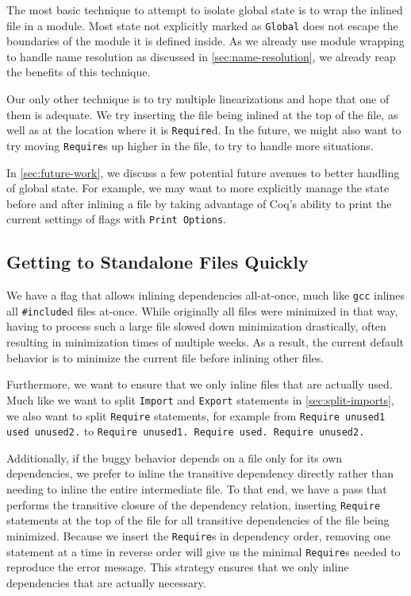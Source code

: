\documentclass[a4paper,USenglish,cleveref,autoref,thm-restate,pdfa]{lipics-v2021}
\begin{document}
The most basic technique to attempt to isolate global state is to wrap the inlined file in a module.
Most state not explicitly marked as \texttt{Global} does not escape the boundaries of the module it is defined inside.
As we already use module wrapping to handle name resolution as discussed in \autoref{sec:name-resolution}, we already reap the benefits of this technique.

Our only other technique is to try multiple linearizations and hope that one of them is adequate.
We try inserting the file being inlined at the top of the file, as well as at the location where it is \texttt{Require}d.
In the future, we might also want to try moving \texttt{Require}s up higher in the file, to try to handle more situations.

In \autoref{sec:future-work}, we discuss a few potential future avenues to better handling of global state.
For example, we may want to more explicitly manage the state before and after inlining a file by taking advantage of Coq's ability to print the current settings of flags with \texttt{Print Options}.

\subsection{Getting to Standalone Files Quickly}
We have a flag that allows inlining dependencies all-at-once, much like \texttt{gcc} inlines all \verb|#include|d files at-once.
While originally all files were minimized in that way, having to process such a large file slowed down minimization drastically, often resulting in minimization times of multiple weeks.
As a result, the current default behavior is to minimize the current file before inlining other files.

Furthermore, we want to ensure that we only inline files that are actually used.
Much like we want to split \texttt{Import} and \verb|Export| statements in \autoref{sec:split-imports}, we also want to split \verb|Require| statements, for example from \texttt{Require unused1 used unused2.} to \texttt{Require unused1. Require used. Require unused2.}

Additionally, if the buggy behavior depends on a file only for its own dependencies, we prefer to inline the transitive dependency directly rather than needing to inline the entire intermediate file.
To that end, we have a pass that performs the transitive closure of the dependency relation, inserting \verb|Require| statements at the top of the file for all transitive dependencies of the file being minimized.
Because we insert the \verb|Require|s in dependency order, removing one statement at a time in reverse order will give us the minimal \verb|Require|s needed to reproduce the error message.
This strategy ensures that we only inline dependencies that are actually necessary.
\end{document}
